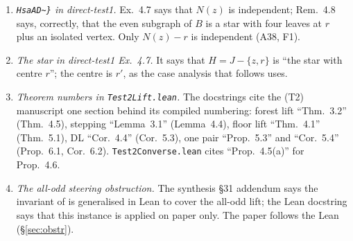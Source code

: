 \documentclass[11pt]{amsart}
\theoremstyle{definition}
\begin{document}
\begin{enumerate}[leftmargin=*]
Thms~123, 128; A8; $d=8$ is conditional, Remark~\ref{rem:grading}). It is a frontier for (T2) only in the sense of \S\ref{sec:frontier}: the uniform
lifts need the same two-pair compatibility there.
\item \emph{\texttt{HsaAD\textasciitilde\}} in direct-test1.} Ex.~4.7 says that $N(z)$ is independent;
Rem.~4.8 says, correctly, that the even subgraph of $B$ is a star with four leaves at $r$ plus an isolated
vertex. Only $N(z)-r$ is independent (A38, F1).
\item \emph{The star in direct-test1 Ex.~4.7.} It says that $H=J-\{z,r\}$ is ``the star with centre
$r$''; the centre is $r'$, as the case analysis that follows uses.
\item \emph{Theorem numbers in \texttt{Test2Lift.lean}.} The docstrings cite the (T2) manuscript one
section behind its compiled numbering: forest lift ``Thm.~3.2'' (Thm.~4.5), stepping ``Lemma~3.1''
(Lemma~4.4), floor lift ``Thm.~4.1'' (Thm.~5.1), DL ``Cor.~4.4'' (Cor.~5.3), one pair ``Prop.~5.3'' and
``Cor.~5.4'' (Prop.~6.1, Cor.~6.2). \texttt{Test2Converse.lean} cites ``Prop.~4.5(a)'' for Prop.~4.6.
\item \emph{The all-odd steering obstruction.} The synthesis \S31 addendum says the invariant of
 is generalised in Lean to cover the all-odd lift; the Lean docstring says that this
instance is applied on paper only. The paper follows the Lean (\S\ref{sec:obstr}).
\end{enumerate}
\end{document}
